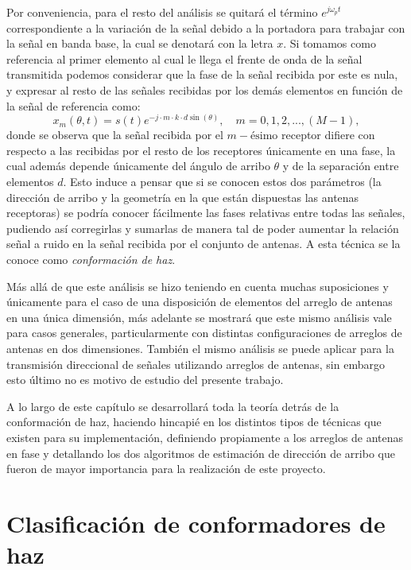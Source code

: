 Por conveniencia, para el resto del análisis se quitará el término $e^{j\omega_p t}$ correspondiente a la variación de la señal debido a la portadora para trabajar con la señal en banda base, la cual se denotará con la letra $x$. Si tomamos como referencia al primer elemento al cual le llega el frente de onda de la señal transmitida podemos considerar que la fase de la señal recibida por este es nula, y expresar al resto de las señales recibidas por los demás elementos en función de la señal de referencia como:
\begin{equation}
    x_m (\theta,t) =s(t) e^{-j\cdot m \cdot k \cdot d\sin(\theta)},\quad m=0,1,2,...,(M-1),
    \label{eq:beamforming_sample_ula_iso}
\end{equation}
donde se observa que la señal recibida por el $m-\textrm{ésimo}$ receptor difiere con respecto a las recibidas por el resto de los receptores únicamente en una fase, la cual además depende únicamente del ángulo de arribo $\theta$ y de la separación entre elementos $d$. Esto induce a pensar que si se conocen estos dos parámetros (la dirección de arribo y la geometría en la que están dispuestas las antenas receptoras) se podría conocer fácilmente las fases relativas entre todas las señales, pudiendo así corregirlas y sumarlas de manera tal de poder aumentar la relación señal a ruido en la señal recibida por el conjunto de antenas. A esta técnica se la conoce como \emph{conformación de haz}.

Más allá de que este análisis se hizo teniendo en cuenta muchas suposiciones y únicamente para el caso de una disposición de elementos del arreglo de antenas en una única dimensión, más adelante se mostrará que este mismo análisis vale para casos generales, particularmente con distintas configuraciones de arreglos de antenas en dos dimensiones. También el mismo análisis se puede aplicar para la transmisión direccional de señales utilizando arreglos de antenas, sin embargo esto último no es motivo de estudio del presente trabajo.

A lo largo de este capítulo se desarrollará toda la teoría detrás de la conformación de haz, haciendo hincapié en los distintos tipos de técnicas que existen para su implementación, definiendo propiamente a los arreglos de antenas en fase y detallando los dos algoritmos de estimación de dirección de arribo que fueron de mayor importancia para la realización de este proyecto.



\section{Clasificación de conformadores de haz}

